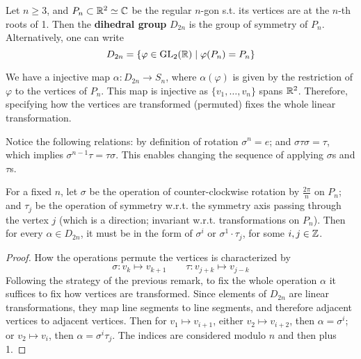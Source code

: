 \documentclass{article}
\begin{document}
\begin{definition}
    Let $n \geq 3$, and $P_n \subset \mathbb{R}^2 \simeq \mathbb{C}$ be the regular $n$-gon s.t. its vertices are at the $n$-th roots of 1. Then the \textbf{dihedral group} $D_{2n}$ is the group of symmetry of $P_n$. Alternatively, one can write
    \[
        D_{2n} = \{ \varphi \in \mathrm{GL}_2(\mathbb{R}) \mid \varphi(P_n) = P_n \}
    \]
\end{definition}

\begin{remark}
    We have a injective map $\alpha: D_{2n} \to S_n$, where $\alpha(\varphi)$ is given by the restriction of $\varphi$ to the vertices of $P_n$. This map is injective as $\{v_1, \dots, v_n\}$ spans $\mathbb{R}^2$. Therefore, specifying how the vertices are transformed (permuted) fixes the whole linear transformation.
\end{remark}

\begin{remark}
    Notice the following relations: by definition of rotation $\sigma^n = e$; and $\sigma \tau \sigma = \tau$, which implies $\sigma^{n-1} \tau = \tau \sigma$. This enables changing the sequence of applying $\sigma$s and $\tau$s.
\end{remark}

\begin{proposition}
    For a fixed $n$, let $\sigma$ be the operation of counter-clockwise rotation by $\frac{2\pi}{n}$ on $P_n$; and $\tau_j$ be the operation of symmetry w.r.t. the symmetry axis passing through the vertex $j$ (which is a direction; invariant w.r.t. transformations on $P_n$). Then for every $\alpha \in D_{2n}$, it must be in the form of $\sigma^i$ or $\sigma^1 \cdot \tau_j$, for some $i, j \in \mathbb{Z}$.
\end{proposition}

\begin{proof}
    How the operations permute the vertices is characterized by
    \[
        \sigma: v_k \mapsto v_{k + 1} \qquad \tau: v_{j+k} \mapsto v_{j-k}
    \]
    Following the strategy of the previous remark, to fix the whole operation $\alpha$ it suffices to fix how vertices are transformed. Since elements of $D_{2n}$ are linear transformations, they map line segments to line segments, and therefore adjacent vertices to adjacent vertices. Then for $v_1 \mapsto v_{i+1}$, either $v_2 \mapsto v_{i+2}$, then $\alpha = \sigma^i$; or $v_2 \mapsto v_{i}$, then $\alpha = \sigma^i \tau_j$. The indices are considered modulo $n$ and then plus 1. 
\end{proof}
\end{document}
